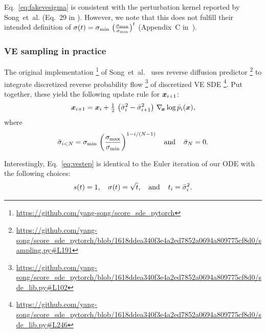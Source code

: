 Eq.~\ref{eq:fakevesigma} is consistent with the perturbation kernel reported by Song~et~al. (Eq.~29 in \cite{Song2021sde}).
However, we note that this does not fulfill their intended definition of $\sigma(t) = \smin ~\big( \tfrac{\smax}{\smin} \big)^t$ (Appendix~C in~\cite{Song2021sde}).

\subsubsection{VE sampling in practice}

The original implementation%
\footnote{\small\url{https://github.com/yang-song/score\_sde\_pytorch}}
of Song~et~al.~\cite{Song2021sde} uses reverse diffusion predictor%
\footnote{\tiny\url{https://github.com/yang-song/score\_sde\_pytorch/blob/1618ddea340f3e4a2ed7852a0694a809775cf8d0/sampling.py\#L191}}
to integrate discretized reverse probability flow%
\footnote{\tiny\url{https://github.com/yang-song/score\_sde\_pytorch/blob/1618ddea340f3e4a2ed7852a0694a809775cf8d0/sde\_lib.py\#L102}}
of discretized VE SDE%
\footnote{\tiny\url{https://github.com/yang-song/score\_sde\_pytorch/blob/1618ddea340f3e4a2ed7852a0694a809775cf8d0/sde\_lib.py\#L246}}.
Put together, these yield the following update rule for $\boldsymbol{x}_{i+1}$:
\begin{equation}
  \label{eq:vestep}
  \boldsymbol{x}_{i+1} = \boldsymbol{x}_i + \tfrac{1}{2} ~\big( \bar\sigma_i^2 - \bar\sigma_{i+1}^2 \big) ~\nabla_{\hspace{-0.5mm}\boldsymbol{x}} \log \bar p_i (\boldsymbol{x})
  \text{,}
\end{equation}
where
\begin{equation}
  \bar\sigma_{i<N} = \smin ~\bigg( \frac{\smax}{\smin} \bigg)^{1 - i / (N-1)}
  \hspace{4mm}\text{and}\hspace{4mm}
  \bar\sigma_N = 0
  \text{.}
\end{equation}

Interestingly, Eq.~\ref{eq:vestep} is identical to the Euler iteration of our ODE with the following choices:
\begin{equation}
  s(t) = 1
  \text{,}\hspace{4mm}
  \sigma(t) = \sqrt{t}
  \text{,}\hspace{4mm}\text{and}\hspace{4mm}
  t_i = \bar\sigma_i^2
  \text{.}
\end{equation}

